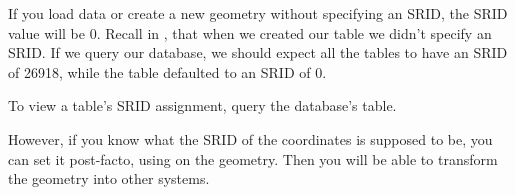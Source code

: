 \documentclass[a4paper,11pt,english]{sphinxmanual}
\begin{document}
If you load data or create a new geometry without specifying an SRID, the SRID value will be 0.  Recall in , that when we created our  table we didn’t specify an SRID. If we query our database, we should expect all the  tables to have an SRID of 26918, while  the  table defaulted to an SRID of 0.

To view a table’s SRID assignment, query the database’s  table.

\begin{sphinxVerbatim}[commandchars=\\\{\}]
    
 
\end{sphinxVerbatim}

\begin{sphinxVerbatim}[commandchars=\\\{\}]
                  
     
     
           
   
                
\end{sphinxVerbatim}

However, if you know what the SRID of the coordinates is supposed to be, you can set it post-facto, using  on the geometry. Then you will be able to transform the geometry into other systems.

\begin{sphinxVerbatim}[commandchars=\\\{\}]
 
 
\end{sphinxVerbatim}
\end{document}
